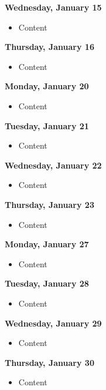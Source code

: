 \documentclass{article}
\begin{document}
\textbf{Wednesday, January 15}

\begin{itemize}
\item Content
\end{itemize}

\textbf{Thursday, January 16}

\begin{itemize}
\item Content
\end{itemize}

\textbf{Monday, January 20}

\begin{itemize}
\item Content
\end{itemize}

\textbf{Tuesday, January 21}

\begin{itemize}
\item Content
\end{itemize}

\textbf{Wednesday, January 22}

\begin{itemize}
\item Content
\end{itemize}

\textbf{Thursday, January 23}

\begin{itemize}
\item Content
\end{itemize}

\textbf{Monday, January 27}

\begin{itemize}
\item Content
\end{itemize}

\textbf{Tuesday, January 28}

\begin{itemize}
\item Content
\end{itemize}

\textbf{Wednesday, January 29}

\begin{itemize}
\item Content
\end{itemize}

\textbf{Thursday, January 30}

\begin{itemize}
\item Content
\end{itemize}
\end{document}
